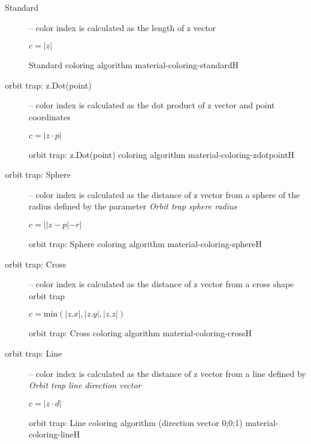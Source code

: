 \begin{description}
	\item[Standard] -- color index is calculated as the length of z vector
	\begin{center}
		\(c = |z|\)
	\end{center}
	{Standard coloring algorithm}
	{material-coloring-standard}{H}
	
	\item[orbit trap: z.Dot(point)] -- color index is calculated as the dot product of z vector and point coordinates
	\begin{center}
		\(c = |z \cdot p|\)
	\end{center}
	{orbit trap: z.Dot(point) coloring algorithm}
	{material-coloring-zdotpoint}{H}
	
	\item[orbit trap: Sphere] -- color index is calculated as the distance of z vector from a sphere of the radius defined by the parameter \emph{Orbit trap sphere radius}
	\begin{center}
		\(c = ||z - p|-r|\)
	\end{center}
	{orbit trap: Sphere coloring algorithm}
	{material-coloring-sphere}{H}
	
	\item[orbit trap: Cross] -- color index is calculated as the distance of z vector from a cross shape orbit trap
	\begin{center}
		\(c = \mathrm{min}(|z.x|, |z.y|, |z.z|)\)
	\end{center}
	{orbit trap: Cross coloring algorithm}
	{material-coloring-cross}{H}
	
	\item[orbit trap: Line] -- color index is calculated as the distance of z vector from a line defined by \emph{Orbit trap line direction vector}
	\begin{center}
		\(c = |z \cdot d|\)
	\end{center}
	{orbit trap: Line coloring algorithm (direction vector 0;0;1)}
	{material-coloring-line}{H}
\end{description}

